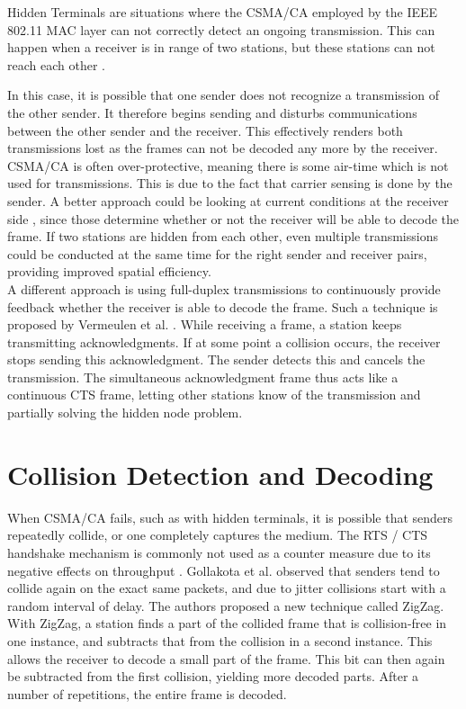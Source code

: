 Hidden Terminals are situations where the \gls{CSMA/CA} employed by the IEEE 802.11 MAC layer can not correctly detect an ongoing transmission. This can happen when a receiver is in range of two stations, but these stations can not reach each other \cite{perahia2013}.

In this case, it is possible that one sender does not recognize a transmission of the other sender. It therefore begins sending and disturbs communications between the other sender and the receiver. This effectively renders both transmissions lost as the frames can not be decoded any more by the receiver.\\

\gls{CSMA/CA} is often over-protective, meaning there is some air-time which is not used for transmissions. This is due to the fact that carrier sensing is done by the sender. A better approach could be looking at current conditions at the receiver side \cite{halperin2007}, since those determine whether or not the receiver will be able to decode the frame. If two stations are hidden from each other, even multiple transmissions could be conducted at the same time for the right sender and receiver pairs, providing improved spatial efficiency.\\

A different approach is using full-duplex transmissions to continuously provide feedback whether the receiver is able to decode the frame. Such a technique is proposed by Vermeulen et al. \cite{vermeulen2016}. While receiving a frame, a station keeps transmitting acknowledgments. If at some point a collision occurs, the receiver stops sending this acknowledgment. The sender detects this and cancels the transmission. The simultaneous acknowledgment frame thus acts like a continuous CTS frame, letting other stations know of the transmission and partially solving the hidden node problem.



\section{Collision Detection and Decoding}

When \gls{CSMA/CA} fails, such as with hidden terminals, it is possible that senders repeatedly collide, or one completely captures the medium. The \gls{RTS} / \gls{CTS} handshake mechanism is commonly not used as a counter measure due to its negative effects on throughput \cite{bianchi2000, gollakota2008, choi2013}. Gollakota et al. observed that senders tend to collide again on the exact same packets, and due to jitter collisions start with a random interval of delay. The authors proposed a new technique called ZigZag. With ZigZag, a station finds a part of the collided frame that is collision-free in one instance, and subtracts that from the collision in a second instance. This allows the receiver to decode a small part of the frame. This bit can then again be subtracted from the first collision, yielding more decoded parts. After a number of repetitions, the entire frame is decoded.

